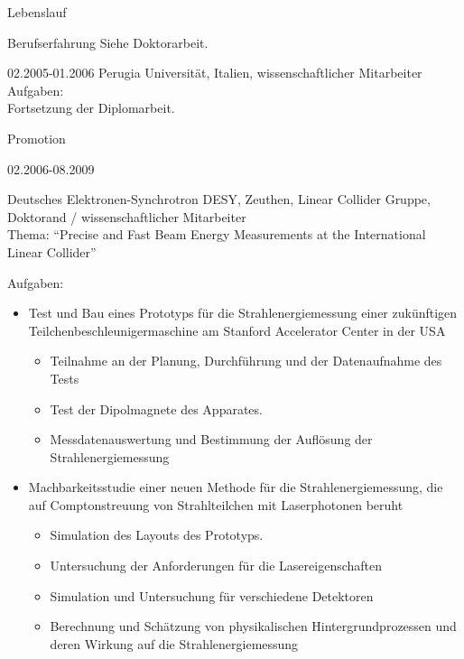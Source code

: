 \documentclass[11pt,a4paper]{scrartcl}
\begin{document}
\begin{cv}{Lebenslauf}
\begin{cvlist}{Berufserfahrung}
Siehe Doktorarbeit.

\item[02.2005-01.2006] Perugia
Universit\"at, Italien, wissenschaftlicher Mitarbeiter \\

Aufgaben:\\

Fortsetzung der Diplomarbeit.

\end{cvlist}

\begin{cvlist}{Promotion}
\item[02.2006-08.2009]

Deutsches Elektronen-Synchrotron DESY, Zeuthen, Linear Collider
Gruppe, Doktorand / wissenschaftlicher Mitarbeiter\\ Thema:
"`Precise and Fast Beam Energy Measurements at the International
Linear Collider"'

Aufgaben:\\

\begin{itemize}
  
  \item Test und Bau eines Prototyps f{\"u}r die
  Strahlenergiemessung einer zuk{\"u}nftigen
  Teilchenbeschleunigermaschine am Stanford Accelerator Center in
  der USA
  \begin{itemize}
    \item Teilnahme an der Planung, Durchf{\"u}hrung und der
    Datenaufnahme des Tests
    \item Test der Dipolmagnete des Apparates.
    \item Messdatenauswertung und Bestimmung der Aufl{\"o}sung der
    Strahlenergiemessung
  \end{itemize}
  
  \item Machbarkeitsstudie einer neuen Methode f{\"u}r die
  Strahlenergiemessung, die auf Comptonstreuung von
  Strahlteilchen mit Laserphotonen beruht
  \begin{itemize}
    \item Simulation des Layouts des Prototyps.
    \item Untersuchung der Anforderungen f{\"u}r die
    Lasereigenschaften
    \item Simulation und Untersuchung f{\"u}r verschiedene
    Detektoren
    \item Berechnung und Sch{\"a}tzung von physikalischen
    Hintergrundprozessen und deren Wirkung auf die
    Strahlenergiemessung
  \end{itemize}
  

\end{itemize}
\end{cvlist}
\end{cv}
\end{document}
